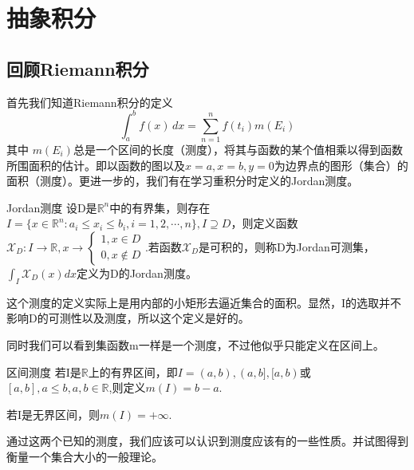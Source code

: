 \chapter{抽象积分}

\section{回顾Riemann积分}
首先我们知道Riemann积分的定义
$$\int_{a}^{b} f(x) \,dx=\sum_{n = 1}^{n}f(t_{i})m(E_{i}) $$
其中 $m(E_{i})$总是一个区间的长度（测度），将其与函数的某个值相乘以得到函数所围面积的估计。即以函数的图以及$x=a,x=b,y=0$为边界点的图形（集合）的面积（测度）。更进一步的，我们有在学习重积分时定义的Jordan测度。
\begin{definition}{Jordan测度}
设D是$\mathbb{R}^{n}$中的有界集，则存在$I=\{x\in \mathbb{R}^{n}:a_{i}\leqslant x_{i}\leqslant b_{i},i=1,2,\cdots ,n\},I\supseteq D$，则定义函数$\mathcal{X}_D:I\to \mathbb{R},x\to \left\{
    \begin{array}{ll}
        1,x\in D \\
        0,x\notin D 
    \end{array}
\right.$.若函数$\mathcal{X}_{D}$是可积的，则称D为Jordan可测集，$\int_{I}\mathcal{X}_{D}(x)dx$定义为D的Jordan测度。
\end{definition}
这个测度的定义实际上是用内部的小矩形去逼近集合的面积。显然，I的选取并不影响D的可测性以及测度，所以这个定义是好的。
\par
同时我们可以看到集函数m一样是一个测度，不过他似乎只能定义在区间上。
\begin{definition}{区间测度}
若I是$\mathbb{R} $上的有界区间，即$I=(a,b),(a,b],[a,b)$或$[a,b],a\leqslant b,a,b\in \mathbb{R}$,则定义$m(I)=b-a$.
\par
若I是无界区间，则$m(I)=+\infty. $
\end{definition}
通过这两个已知的测度，我们应该可以认识到测度应该有的一些性质。并试图得到衡量一个集合大小的一般理论。
